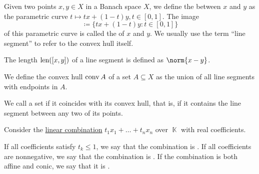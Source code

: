 \begin{definition}\label{def:convex_set}
  \hfill
  \begin{thmenum}
     Given two points \( x, y \in X \) in a Banach space \( X \), we define the  between \( x \) and \( y \) as the parametric curve \( t \mapsto tx + (1-t)y, t \in [0, 1] \). The image
    \begin{equation*}
      [x, y] \coloneqq \{ tx + (1-t)y \colon t \in [0, 1] \}
    \end{equation*}
    of this parametric curve is called the  of \( x \) and \( y \). We usually use the term \enquote{line segment} to refer to the convex hull itself.

    The length \( \operatorname{len}([x, y]) \) of a line segment is defined as \( \norm{x - y} \).

     We define the convex hull \( \operatorname{conv} A \) of a set \( A \subseteq X \) as the union of all line segments with endpoints in \( A \).

     We call a set  if it coincides with its convex hull, that is, if it contains the line segment between any two of its points.
  \end{thmenum}
\end{definition}

\begin{definition}\label{def:convex_combination}\mimprovised
  Consider the \hyperref[rem:linear_combinations]{linear combination} \( t_1 x_1 + \ldots + t_n x_n \) over \( \BbbK \) with real coefficients.

  \begin{thmenum}
     If all coefficients satisfy \( t_k \leq 1 \), we say that the combination is .
     If all coefficients are nonnegative, we say that the combination is .
     If the combination is both affine and conic, we say that it is .
  \end{thmenum}
\end{definition}

